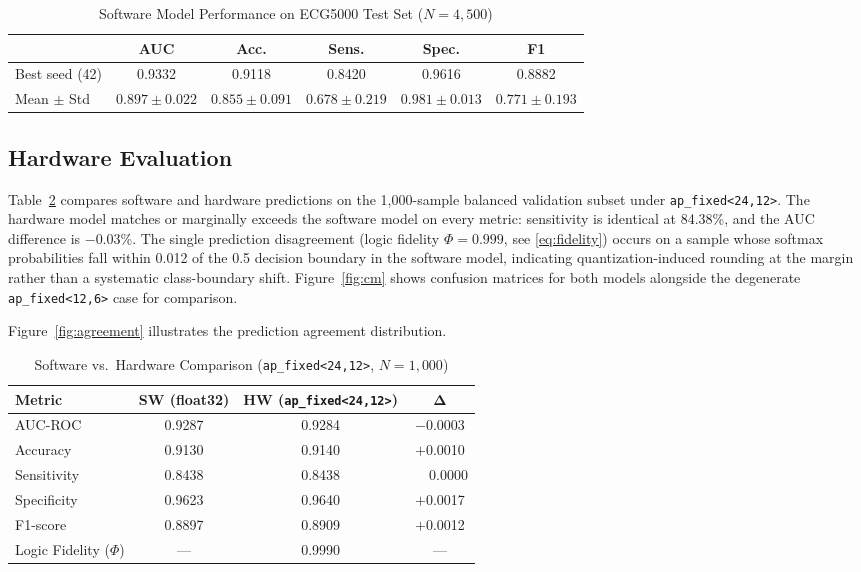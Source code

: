 \documentclass[12pt, letterpaper]{article}
\begin{document}
\begin{table}[!ht]
  \centering
  \caption{Software Model Performance on ECG5000 Test Set ($N = 4{,}500$)}
  \label{tab:sw_results}
  \small
  \begin{tabular}{lccccc}
    \toprule
    & \textbf{AUC} & \textbf{Acc.} & \textbf{Sens.} & \textbf{Spec.} & \textbf{F1} \\
    \midrule
    Best seed (42) & 0.9332 & 0.9118 & 0.8420 & 0.9616 & 0.8882 \\
    Mean $\pm$ Std & $0.897{\pm}0.022$ & $0.855{\pm}0.091$ & $0.678{\pm}0.219$ & $0.981{\pm}0.013$ & $0.771{\pm}0.193$ \\
    \bottomrule
  \end{tabular}
\end{table}

\subsection{Hardware Evaluation}

Table~\ref{tab:hw_compare} compares software and hardware predictions on
the 1,000-sample balanced validation subset under \texttt{ap\_fixed<24,12>}.
The hardware model matches or marginally exceeds the software model on
every metric: sensitivity is identical at 84.38\%, and the AUC difference
is $-0.03$\%. The single prediction disagreement (logic fidelity $\Phi = 0.999$,
see \eqref{eq:fidelity}) occurs on a sample whose softmax probabilities
fall within 0.012 of the 0.5 decision boundary in the software model,
indicating quantization-induced rounding at the margin rather than a
systematic class-boundary shift. Figure~\ref{fig:cm} shows confusion
matrices for both models alongside the degenerate \texttt{ap\_fixed<12,6>}
case for comparison.

Figure~\ref{fig:agreement} illustrates the prediction agreement distribution. 

\begin{table}[!ht]
  \centering
  \caption{Software vs.\ Hardware Comparison (\texttt{ap\_fixed<24,12>}, $N = 1{,}000$)}
  \label{tab:hw_compare}
  \small
  \begin{tabular}{lccc}
    \toprule
    \textbf{Metric} & \textbf{SW (float32)} & \textbf{HW (\texttt{ap\_fixed<24,12>})} & $\boldsymbol{\Delta}$ \\
    \midrule
    AUC-ROC & 0.9287 & 0.9284 & $-$0.0003 \\
    Accuracy & 0.9130 & 0.9140 & $+$0.0010 \\
    Sensitivity & 0.8438 & 0.8438 & $\phantom{+}$0.0000 \\
    Specificity & 0.9623 & 0.9640 & $+$0.0017 \\
    F1-score & 0.8897 & 0.8909 & $+$0.0012 \\
    Logic Fidelity ($\Phi$) & --- & 0.9990 & --- \\
    \bottomrule
  \end{tabular}
\end{table}
\end{document}
